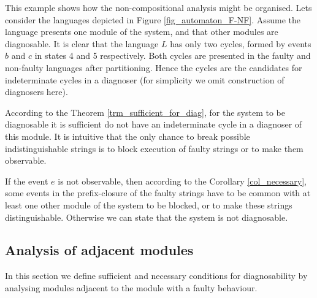 \documentclass[a4paper, 10pt, conference]{ieeeconf}
\begin{document}
\begin{example} This example shows how the non-compositional analysis might be
organised.
Lets consider the languages depicted in Figure \ref{fig_automaton_F-NF}.
Assume the language presents one module of the system, and that other modules
are diagnosable. It is clear that the language $L$ has only two cycles, formed
by events $b$ and $c$ in states 4 and 5 respectively.
Both cycles are presented in the faulty and non-faulty languages after
partitioning. Hence the cycles are the candidates for indeterminate cycles in a
diagnoser (for simplicity we omit construction of diagnosers here). 

According to the Theorem \ref{trm_sufficient_for_diag}, for the system to be 
diagnosable it is sufficient do not have an indeterminate cycle in a diagnoser
of this module. It is intuitive that the only chance to break
possible indistinguishable strings is to block execution of faulty strings
or to make them observable.

If the event $e$ is not observable, then according to the Corollary
\ref{col_necessary}, some events in the prefix-closure of the faulty strings
have to be common with at least one other module of the system to be blocked, or
to make these strings distinguishable. Otherwise we can state that the system
is not diagnosable.
\end{example}




\subsection{Analysis of adjacent modules}
In this section we define sufficient and necessary conditions for diagnosability
by analysing modules adjacent to the module with a faulty behaviour.
\end{document}
